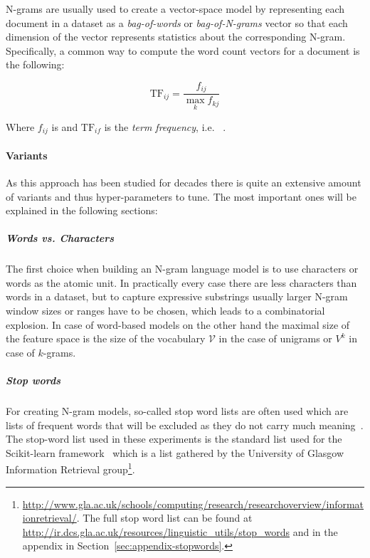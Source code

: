 N-grams are usually used to create a vector-space model by representing each document in a dataset as a \textit{bag-of-words} or \textit{bag-of-N-grams} vector so that each dimension of the vector represents statistics about the corresponding N-gram. Specifically, a common way to compute the word count vectors for a document is the following:

\begin{equation}
  \text{TF}_{ij} = \frac{f_{ij}}{\max_k f_{kj}}
\end{equation}

Where $f_{ij}$ is  and $\text{TF}_{if}$ is the \emph{term frequency}, i.e.   ~\cite[Chapter 1.3.1, p.~8]{Leskovec:2014aa}.


\paragraph{Variants}

As this approach has been studied for decades  there is quite an extensive amount of variants and thus hyper-parameters to tune. The most important ones will be explained in the following sections:

\subparagraph{Words vs. Characters} The first choice when building an N-gram language model is to use characters or words as the atomic unit. In practically every case there are less characters than words in a dataset, but to capture expressive substrings usually larger N-gram window sizes or ranges have to be chosen, which leads to a combinatorial explosion. In case of word-based models on the other hand the maximal size of the feature space is the size of the vocabulary $\mathcal{V}$ in the case of unigrams or $V^k$ in case of $k$-grams.

\subparagraph{Stop words}
\label{subp:Stop words}
For creating N-gram models, so-called stop word lists are often used which are lists of frequent words that will be excluded as they do not carry much meaning~\cite[Chapter 1.3.1, p.~7]{Leskovec:2014aa}. The stop-word list used in these experiments is the standard list used for the Scikit-learn framework~\cite{Pedregosa:2011aa} which is a list gathered by the University of Glasgow Information Retrieval group\footnote{\url{http://www.gla.ac.uk/schools/computing/research/researchoverview/informationretrieval/}. The full stop word list can be found at \url{http://ir.dcs.gla.ac.uk/resources/linguistic_utils/stop_words} and in the appendix in Section~\ref{sec:appendix-stopwords}.}.

